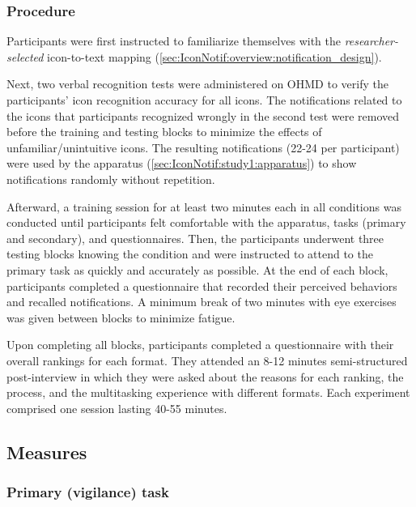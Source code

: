 \subsubsection*{Procedure}
\label{sec:IconNotif:study1:procedure} 

Participants were first instructed to familiarize themselves with the \textit{researcher-selected} icon-to-text mapping (\autoref{sec:IconNotif:overview:notification_design}).

Next, two verbal recognition tests were administered on OHMD to verify the participants' icon recognition accuracy for all icons. The notifications related to the icons that participants recognized wrongly in the second test were removed before the training and testing blocks to minimize the effects of unfamiliar/unintuitive icons. The resulting notifications (22-24 per participant) were used by the apparatus (\autoref{sec:IconNotif:study1:apparatus}) to show notifications randomly without repetition.

Afterward, a training session for at least two minutes each in all conditions was conducted until participants felt comfortable with the apparatus, tasks (primary and secondary), and questionnaires. Then, the participants underwent three testing blocks knowing the condition and were instructed to attend to the primary task as quickly and accurately as possible. At the end of each block, participants completed a questionnaire that recorded their perceived behaviors and recalled notifications. A minimum break of two minutes with eye exercises was given between blocks to minimize fatigue.

Upon completing all blocks, participants completed a questionnaire with their overall rankings for each format. They attended an 8-12 minutes semi-structured post-interview in which they were asked about the reasons for each ranking, the process, and the multitasking experience with different formats. Each experiment comprised one session lasting 40-55 minutes. 




\subsection{Measures}
\label{sec:IconNotif:study1:measures}

\subsubsection*{Primary (vigilance) task}

